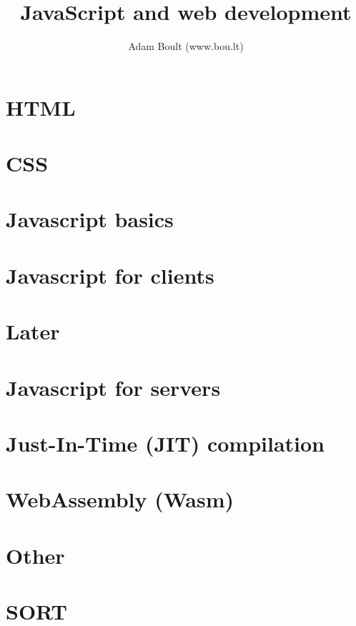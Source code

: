 \documentclass[oneside]{book}
\begin{document}
\author{Adam Boult (www.bou.lt)}
\title{JavaScript and web development}
\maketitle

\setcounter{tocdepth}{0}
\tableofcontents



\part{HTML}


\part{CSS}


\part{Javascript basics}







\part{Javascript for clients}




\part{Later}


\part{Javascript for servers}







\part{Just-In-Time (JIT) compilation}

\part{WebAssembly (Wasm)}

\part{Other}


\part{SORT}

\end{document}
